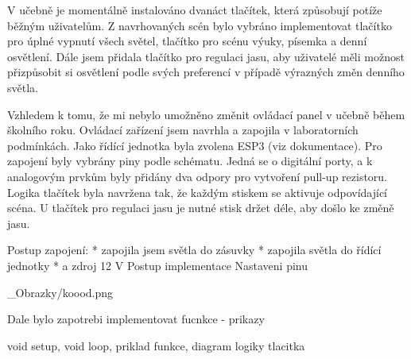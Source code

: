 \medskip
\medskip
\medskip
V učebně je momentálně instalováno dvanáct tlačítek, která způsobují potíže běžným uživatelům. Z navrhovaných scén bylo vybráno implementovat tlačítko pro úplné vypnutí všech světel, tlačítko pro scénu výuky, písemka a denní osvětlení. Dále jsem přidala tlačítko pro regulaci jasu, aby uživatelé měli možnost přizpůsobit si osvětlení podle svých preferencí v případě výrazných změn denního světla.

Vzhledem k tomu, že mi nebylo umožněno změnit ovládací panel v učebně během školního roku. Ovládací zařízení jsem navrhla a zapojila v laboratorních podmínkách. Jako řídící jednotka byla zvolena ESP3 (viz dokumentace). Pro zapojení byly vybrány piny podle schématu. Jedná se o digitální porty, a k analogovým prvkům byly přidány dva odpory pro vytvoření pull-up rezistoru. Logika tlačítek byla navržena tak, že každým stiskem se aktivuje odpovídající scéna. U tlačítek pro regulaci jasu je nutné stisk držet déle, aby došlo ke změně jasu.

Postup zapojení:
\begitems
    * zapojila jsem světla do zásuvky
    * zapojila světla do řídící jednotky
    * a zdroj 12 V
\enditems
\medskip
Postup implementace 
\medskip
Nastaveni pinu

\medskip
\picw=8cm _Obrazky/koood.png
\medskip

Dale bylo zapotrebi implementovat fucnkce - prikazy

void setup, void loop, priklad funkce, diagram logiky tlacitka














